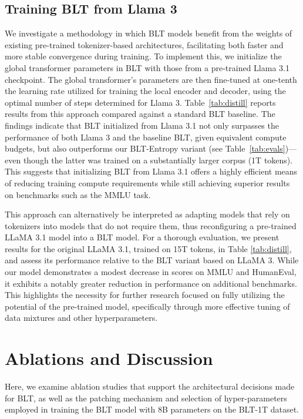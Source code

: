 \subsection{Training {\textsc BLT} from Llama 3}
\label{sec:distillation}
We investigate a methodology in which {\textsc BLT} models benefit from the weights of existing pre-trained tokenizer-based architectures, facilitating both faster and more stable convergence during training. To implement this, we initialize the global transformer parameters in {\textsc BLT} with those from a pre-trained Llama 3.1 checkpoint. The global transformer's parameters are then fine-tuned at one-tenth the learning rate utilized for training the local encoder and decoder, using the optimal number of steps determined for Llama 3. Table~\ref{tab:distill} reports results from this approach compared against a standard {\textsc BLT} baseline. The findings indicate that {\textsc BLT} initialized from Llama 3.1 not only surpasses the performance of both Llama 3 and the baseline {\textsc BLT}, given equivalent compute budgets, but also outperforms our {\textsc BLT}-Entropy variant (see Table~\ref{tab:evals})—even though the latter was trained on a substantially larger corpus (1T tokens). This suggests that initializing {\textsc BLT} from Llama 3.1 offers a highly efficient means of reducing training compute requirements while still achieving superior results on benchmarks such as the MMLU task.

This approach can alternatively be interpreted as adapting models that rely on tokenizers into models that do not require them, thus reconfiguring a pre-trained LLaMA 3.1 model into a {\textsc BLT} model. For a thorough evaluation, we present results for the original LLaMA 3.1, trained on 15T tokens, in Table \ref{tab:distill}, and assess its performance relative to the {\textsc BLT} variant based on LLaMA 3. While our model demonstrates a modest decrease in scores on MMLU and HumanEval, it exhibits a notably greater reduction in performance on additional benchmarks. This highlights the necessity for further research focused on fully utilizing the potential of the pre-trained model, specifically through more effective tuning of data mixtures and other hyperparameters.

\section{Ablations and Discussion}
\label{section:ablations}
Here, we examine ablation studies that support the architectural decisions made for {\textsc BLT}, as well as the patching mechanism and selection of hyper-parameters employed in training the {\textsc BLT} model with 8B parameters on the {\textsc BLT}-1T dataset.

